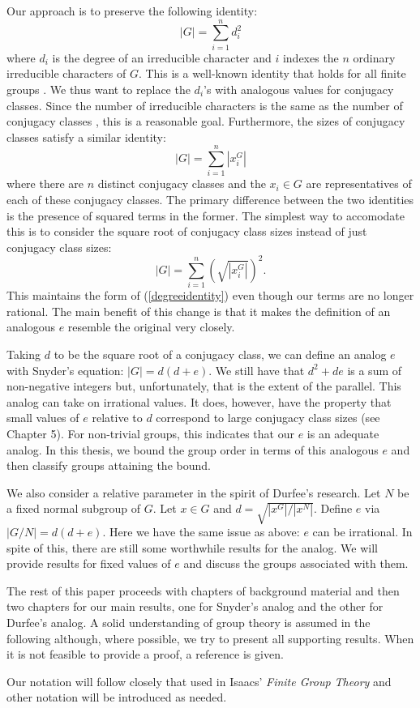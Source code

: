 \documentclass[main.tex]{subfiles}
\begin{document}
Our approach is to preserve the following identity:
\begin{equation}\label{degreeidentity}
|G| = \sum_{i=1}^n d_i^2
\end{equation}
where $d_i$ is the degree of an irreducible character and $i$ indexes the $n$ ordinary irreducible characters of $G$. This is a well-known identity that holds for all finite groups \cite{gorensteinfinitegroups}. We thus want to replace the $d_i$'s with analogous values for conjugacy classes. Since the number of irreducible characters is the same as the number of conjugacy classes \cite[p.96]{gorensteinfinitegroups}, this is a reasonable goal. Furthermore, the sizes of conjugacy classes satisfy a similar identity:
$$|G| = \sum_{i=1}^n |x_i^G|$$
where there are $n$ distinct conjugacy classes and the $x_i \in G$ are representatives of each of these conjugacy classes. The primary difference between the two identities is the presence of squared terms in the former. The simplest way to accomodate this is to consider the square root of conjugacy class sizes instead of just conjugacy class sizes:
$$|G| = \sum_{i=1}^n \left(\sqrt{|x_i^G|}\right)^2\text{.}$$
This maintains the form of (\ref{degreeidentity}) even though our terms are no longer rational. The main benefit of this change is that it makes the definition of an analogous $e$ resemble the original very closely.

Taking $d$ to be the square root of a conjugacy class, we can define an analog $e$ with Snyder's equation: $|G| = d(d+e)$. We still have that  $d^2 + de$ is a sum of non-negative integers but, unfortunately, that is the extent of the parallel. This analog can take on irrational values. It does, however, have the property that small values of $e$ relative to $d$ correspond to large conjugacy class sizes (see Chapter 5). For non-trivial groups, this indicates that our $e$ is an adequate analog. In this thesis, we bound the group order in terms of this analogous $e$ and then classify groups attaining the bound.

We also consider a relative parameter in the spirit of Durfee's research. Let $N$ be a fixed normal subgroup of $G$. Let $x \in G$ and $d = \sqrt{|x^G|/|x^N|}$. Define $e$ via $|G/N| = d(d+e)$. Here we have the same issue as above: $e$ can be irrational. In spite of this, there are still some worthwhile results for the analog. We will provide results for fixed values of $e$ and discuss the groups associated with them.

The rest of this paper proceeds with chapters of background material and then two chapters for our main results, one for Snyder's analog and the other for Durfee's analog. A solid understanding of group theory is assumed in the following although, where possible, we try to present all supporting results. When it is not feasible to provide a proof, a reference is given.

Our notation will follow closely that used in Isaacs' \emph{Finite Group Theory} \cite{isaacsfinitegrouptheory} and other notation will be introduced as needed.
\end{document}
